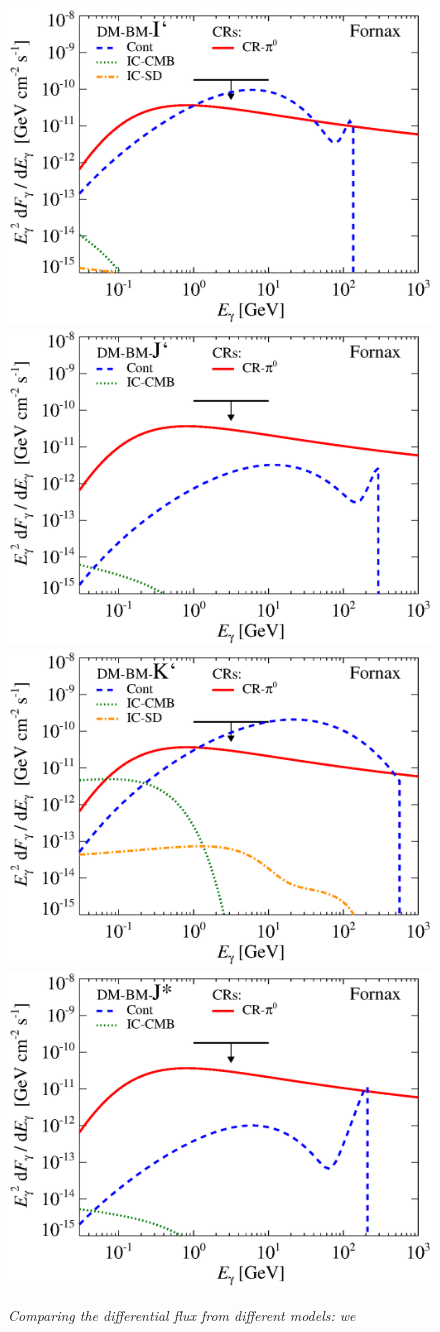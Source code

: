 \documentclass[10pt,aps,pra,reprint,amsmath,amsfonts,amssymb,showpacs,nofootinbib,floatfix]{revtex4-1}
\begin{document}
\begin{figure}
\begin{minipage}{2.0\columnwidth}
 \includegraphics[width=0.49\columnwidth]{figures/flux.BMcompI.v12.0.1deg.1.6T.SubMass.IR2.noMW.woGal.eps}
\includegraphics[width=0.49\columnwidth]{figures/flux.BMcompJ.v12.0.1deg.1.6T.SubMass.IR2.noMW.woGal.eps}
\includegraphics[width=0.49\columnwidth]{figures/flux.BMcompK.v12.0.1deg.1.6T.SubMass.IR2.noMW.woGal.eps}
\includegraphics[width=0.49\columnwidth]{figures/flux.BMcompJs.v12.0.1deg.1.6T.SubMass.IR2.noMW.woGal.eps}
\caption{\it Comparing the differential flux from different models: we
}
\end{minipage}
\end{figure}
\end{document}
